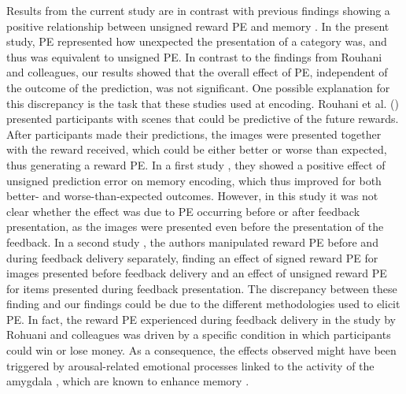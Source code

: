 \documentclass[a4paper,12pt]{article}
\begin{document}
Results from the current study are in contrast with previous findings showing a positive relationship between unsigned reward PE and memory \citep{Rouhani2018, Rouhani2021}. In the present study, PE represented how unexpected the presentation of a category was, and thus was equivalent to unsigned PE. In contrast to the findings from Rouhani and colleagues, our results showed that the overall effect of PE, independent of the outcome of the prediction, was not significant. One possible explanation for this discrepancy is the task that these studies used at encoding. Rouhani et al. (\citeyear{Rouhani2018, Rouhani2021}) presented participants with scenes that could be predictive of the future rewards. After participants made their predictions, the images were presented together with the reward received, which could be either better or worse than expected, thus generating a reward PE. In a first study \citep{Rouhani2018}, they showed a positive effect of unsigned prediction error on memory encoding, which thus improved for both better- and worse-than-expected outcomes. However, in this study it was not clear whether the effect was due to PE occurring before or after feedback presentation, as the images were presented even before the presentation of the feedback. In a second study \citep{Rouhani2021}, the authors manipulated reward PE before and during feedback delivery separately, finding an effect of signed reward PE for images presented before feedback delivery and an effect of unsigned reward PE for items presented during feedback presentation. The discrepancy between these finding and our findings could be due to the different methodologies used to elicit PE. In fact, the reward PE experienced during feedback delivery in the study by Rohuani and colleagues \citep{Rouhani2021} was driven by a specific condition in which participants could win or lose money. As a consequence, the effects observed might have been triggered by arousal-related emotional processes linked to the activity of the amygdala \citep{watanabe2019reward}, which are known to enhance memory  \citep{mather2011arousal}. 

\end{document}
